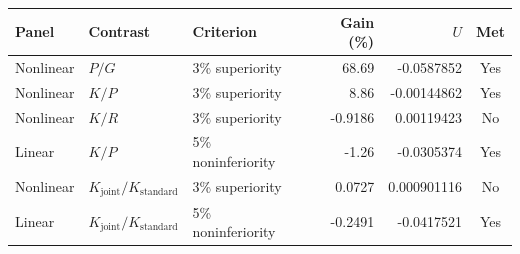 \begin{tabular}{@{}lllrrc@{}}
\toprule
Panel & Contrast & Criterion & Gain (\%) & $U$ & Met \\
\midrule
Nonlinear & $P/G$ & 3\% superiority & 68.69 & -0.0587852 & Yes \\
Nonlinear & $K/P$ & 3\% superiority & 8.86 & -0.00144862 & Yes \\
Nonlinear & $K/R$ & 3\% superiority & -0.9186 & 0.00119423 & No \\
Linear & $K/P$ & 5\% noninferiority & -1.26 & -0.0305374 & Yes \\
Nonlinear & $K_{\mathrm{joint}}/K_{\mathrm{standard}}$ & 3\% superiority & 0.0727 & 0.000901116 & No \\
Linear & $K_{\mathrm{joint}}/K_{\mathrm{standard}}$ & 5\% noninferiority & -0.2491 & -0.0417521 & Yes \\
\bottomrule
\end{tabular}
